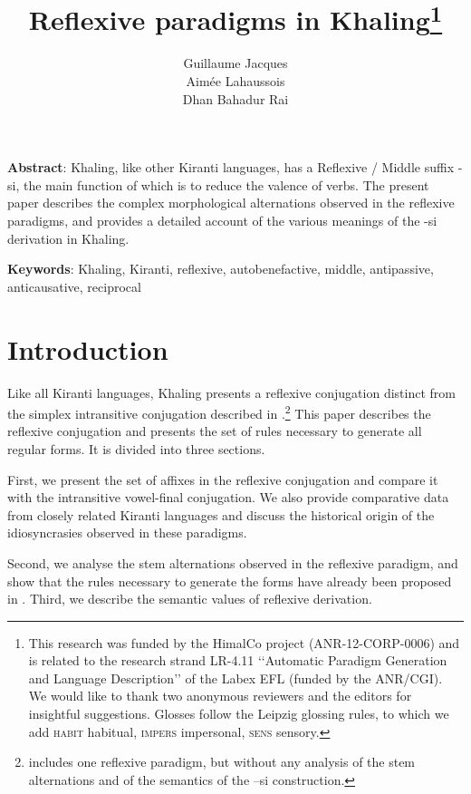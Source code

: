 \documentclass[twoside,a4paper,11pt]{article}
\newcommand{\ipa}[1]{{\phon#1}}
\begin{document}
\title{Reflexive paradigms in Khaling\footnote{This research was funded by the HimalCo project (ANR-12-CORP-0006) and is related to the research strand LR-4.11 ‘‘Automatic Paradigm Generation and Language Description’’ of the Labex EFL (funded by the ANR/CGI). We would like to thank two anonymous reviewers and the editors for insightful suggestions. Glosses follow the Leipzig glossing rules, to which we add \textsc{habit} habitual, \textsc{impers} impersonal, \textsc{sens} sensory.} } 

\author{Guillaume Jacques\\Aimée Lahaussois\\Dhan Bahadur Rai}

\maketitle

\textbf{Abstract}: Khaling, like other Kiranti languages, has a Reflexive / Middle suffix -si, the main function of which is to reduce the valence of verbs. The present paper describes the complex morphological alternations observed in the reflexive paradigms, and provides a detailed account of the various meanings of the -si derivation in Khaling.  


\textbf{Keywords}: Khaling, Kiranti, reflexive,  autobenefactive, middle, antipassive, anticausative, reciprocal


 \section{Introduction}
Like all Kiranti languages, Khaling presents a reflexive conjugation distinct from the simplex intransitive conjugation   described in \citet{jacques12khaling}.\footnote{\citet{toba84khaling} includes one reflexive paradigm, but without any analysis of the stem alternations and of the semantics of the \ipa{--si} construction.}  This paper describes the reflexive conjugation and presents the set of rules necessary to generate all regular forms. It is divided into three sections. 

First, we present the set of affixes in the reflexive conjugation and compare it with the intransitive vowel-final  conjugation. We also provide comparative data from  closely related Kiranti languages and discuss the historical origin of the idiosyncrasies observed in these paradigms.

Second, we analyse the stem alternations observed in the reflexive paradigm, and show that the rules necessary to generate the forms have already been proposed in  \citet{jacques12khaling}. Third, we describe the semantic values of   reflexive derivation.
\end{document}

